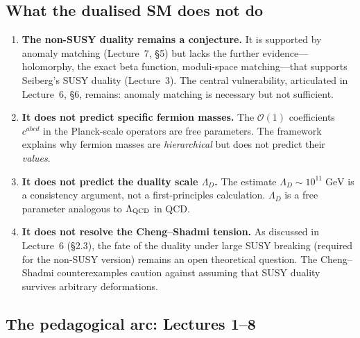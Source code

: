\documentclass[11pt,a4paper]{article}
\begin{document}
\subsection{What the dualised SM does not do}

\begin{enumerate}
  \item \textbf{The non-SUSY duality remains a conjecture.}
    It is supported by anomaly matching (Lecture~7, \S5) but lacks the
    further evidence---holomorphy, the exact beta function, moduli-space
    matching---that supports Seiberg's SUSY duality (Lecture~3).  The
    central vulnerability, articulated in Lecture~6, \S6, remains:
    anomaly matching is necessary but not sufficient.

  \item \textbf{It does not predict specific fermion masses.}
    The $\mathcal{O}(1)$ coefficients $c^{abcd}$ in the Planck-scale
    operators are free parameters.  The framework explains why fermion
    masses are \emph{hierarchical} but does not predict their
    \emph{values}.

  \item \textbf{It does not predict the duality scale $\Lambda_D$.}
    The estimate $\Lambda_D \sim 10^{11}\;\text{GeV}$ is a consistency
    argument, not a first-principles calculation.  $\Lambda_D$ is a
    free parameter analogous to $\Lambda_{\mathrm{QCD}}$ in QCD.

  \item \textbf{It does not resolve the Cheng--Shadmi tension.}
    As discussed in Lecture~6 (\S2.3), the fate of the duality under
    large SUSY breaking (required for the non-SUSY version) remains an
    open theoretical question.  The Cheng--Shadmi counterexamples
    caution against assuming that SUSY duality survives arbitrary
    deformations.
\end{enumerate}

\subsection{The pedagogical arc: Lectures 1--8}
\end{document}
